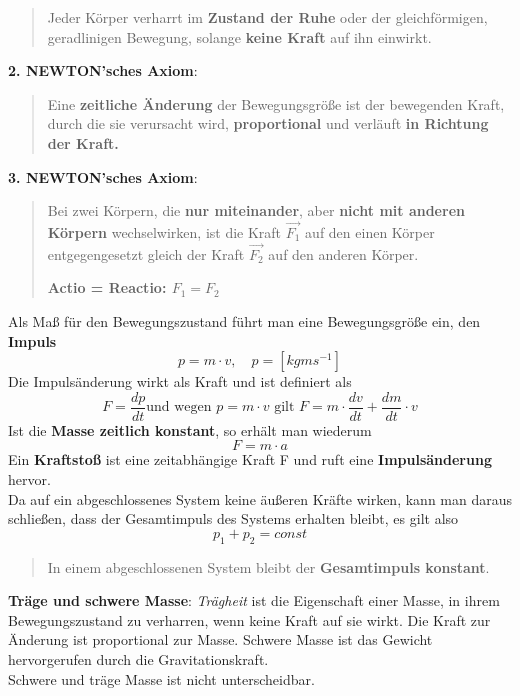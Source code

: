 \documentclass[12pt,a4paper,ngerman]{article}
\begin{document}
\begin{verse}
Jeder Körper verharrt im \textbf{Zustand der Ruhe} oder der gleichförmigen, geradlinigen Bewegung, solange \textbf{keine Kraft} auf ihn einwirkt. 
\end{verse}

\vspace{0.5cm}

\textbf{2. NEWTON'sches Axiom}:

\begin{verse}
Eine \textbf{zeitliche Änderung} der Bewegungsgröße ist der bewegenden Kraft, durch die sie verursacht wird, \textbf{proportional} und verläuft \textbf{in Richtung der Kraft.}
\end{verse}

\vspace{0.5cm}

\textbf{3. NEWTON'sches Axiom}:

\begin{verse}
Bei zwei Körpern, die \textbf{nur miteinander}, aber \textbf{nicht mit anderen Körpern} wechselwirken, ist die Kraft $\vec{F_1}$ auf den einen Körper entgegengesetzt gleich der Kraft $\vec{F_2}$ auf den anderen Körper. \\
\begin{center}
\textbf{Actio = Reactio: $F_1 = F_2$}
\end{center}
\end{verse}

\vspace{0.5cm}

Als Maß für den Bewegungszustand führt man eine Bewegungsgröße ein, den \textbf{Impuls}
\begin{equation}
p = m \cdot v , \quad p = [kgms^{-1}]
\end{equation}
Die Impulsänderung wirkt als Kraft und ist definiert als
\begin{equation}
F = \frac{dp}{dt} \text{und wegen } p = m \cdot v \text{ gilt } F = m \cdot \frac{dv}{dt} + \frac{dm}{dt}\cdot v
\end{equation}
Ist die \textbf{Masse zeitlich konstant}, so erhält man wiederum 
\begin{equation}
F = m \cdot a
\end{equation}
Ein \textbf{Kraftstoß} ist eine zeitabhängige Kraft F und ruft eine \textbf{Impulsänderung} hervor. \\
Da auf ein abgeschlossenes System keine äußeren Kräfte wirken, kann man daraus schließen, dass der Gesamtimpuls des Systems erhalten bleibt, es gilt also
\begin{equation}
p_1 + p_2 = const
\end{equation}
\begin{verse}
In einem abgeschlossenen System bleibt der \textbf{Gesamtimpuls konstant}. 
\end{verse}
\textbf{Träge und schwere Masse}: \textit{Trägheit} ist die Eigenschaft einer Masse, in ihrem Bewegungszustand zu verharren, wenn keine Kraft auf sie wirkt. Die Kraft zur Änderung ist proportional zur Masse. Schwere Masse ist das Gewicht hervorgerufen durch die Gravitationskraft. \\
Schwere und träge Masse ist nicht unterscheidbar. 
\end{document}
